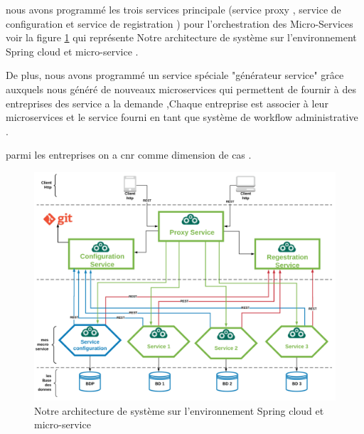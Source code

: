     nous avons programmé les trois services principale (service proxy , service de configuration et service de registration ) pour l'orchestration des Micro-Services voir la figure \ref{fig:cloudms}  qui représente Notre architecture de système sur l'environnement Spring cloud et micro-service . 

      De plus, nous avons programmé un service spéciale "générateur service"  grâce auxquels nous généré de nouveaux  microservices qui permettent de fournir   à des entreprises  des service a la demande ,Chaque entreprise est associer à leur microservices et le  service fourni en tant que système de workflow administrative .
 
 parmi les entreprises on a  \ac{cnr} comme dimension de cas .
     
\begin{figure}[H]
	\centering
	\includegraphics[width=1\linewidth]{images/cloudMS}
	\caption{Notre architecture de système sur l'environnement Spring cloud et micro-service}
	\label{fig:cloudms}
\end{figure}
